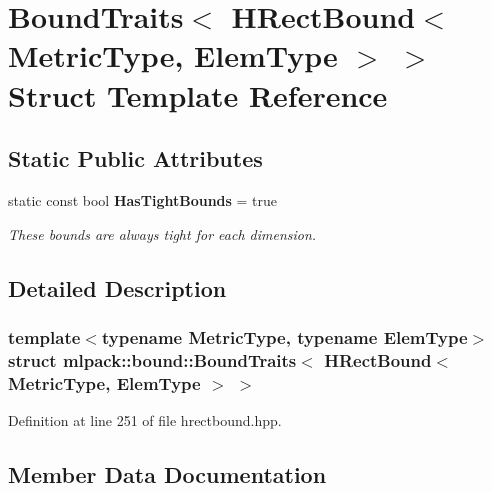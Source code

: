 \section{Bound\+Traits$<$ H\+Rect\+Bound$<$ Metric\+Type, Elem\+Type $>$ $>$ Struct Template Reference}
\label{structmlpack_1_1bound_1_1BoundTraits_3_01HRectBound_3_01MetricType_00_01ElemType_01_4_01_4}
\subsection*{Static Public Attributes}
\begin{DoxyCompactItemize}
\item 
static const bool \textbf{ Has\+Tight\+Bounds} = true
\begin{DoxyCompactList}\small\item\em These bounds are always tight for each dimension. \end{DoxyCompactList}\end{DoxyCompactItemize}


\subsection{Detailed Description}
\subsubsection*{template$<$typename Metric\+Type, typename Elem\+Type$>$\newline
struct mlpack\+::bound\+::\+Bound\+Traits$<$ H\+Rect\+Bound$<$ Metric\+Type, Elem\+Type $>$ $>$}



Definition at line 251 of file hrectbound.\+hpp.



\subsection{Member Data Documentation}
\mbox{\label{structmlpack_1_1bound_1_1BoundTraits_3_01HRectBound_3_01MetricType_00_01ElemType_01_4_01_4_af41e456bf5ea6c0557730318fe660d2d}} 
